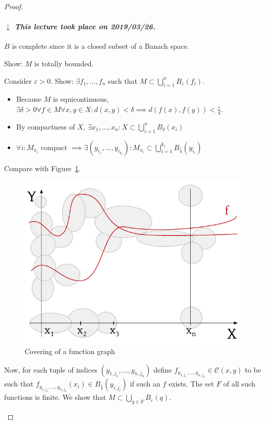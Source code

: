\documentclass{article}
\numberwithin{lecref}{section}
\newcommand{\dateref}[1]{%
  \begin{mdframed}[backgroundcolor=gray!10,innerbottommargin=0pt,innertopmargin=0pt]
    \paragraph{\textit{$\downarrow$ This lecture took place on #1.}}%
  \end{mdframed}%
}
\begin{document}
\begin{proof}
\begin{enumerate}
\begin{description}
					\dateref{2019/03/26}
					$B$ is complete since it is a closed subset of a Banach space.

					Show: $M$ is totally bounded.

					Consider $\varepsilon > 0$. Show: $\exists f_1, \dots, f_n$ such that $M \subset \bigcup_{i=1}^n B_\varepsilon(f_i)$.

					\begin{itemize}
						\item Because $M$ is equicontinuous, $\exists \delta > 0 \forall f \in M \forall x, y \in X: d(x, y) < \delta \implies d(f(x), f(y)) < \frac\varepsilon4$.
						\item By compactness of $X$, $\exists x_1, \dots, x_n: X \subset \bigcup_{i=1}^n B_\delta(x_i)$
						\item $\forall i: M_{x_i} \text{ compact } \implies \exists (y_{i_1}, \dots, y_{i_{k_i}}): M_{x_i} \subset \bigcup_{i=1}^{k_i} B_{\frac\varepsilon4}(y_{i_i})$
					\end{itemize}

					Compare with Figure~\ref{img:cov}.

					\begin{figure}[t]
						\begin{center}
							\includegraphics{img/covering.pdf}
							\caption{Covering of a function graph}
							\label{img:cov}
						\end{center}
					\end{figure}

					Now, for each tuple of indices $(y_{1,j_1}, \dots, y_{n,j_n})$ define $f_{y_{1,j_1}, \dots, y_{n,j_n}} \in \mathcal C(x, y)$ to be such that $f_{y_{1,j_1},\dots,y_{n,j_n}}(x_i) \in B_{\frac\varepsilon4}(y_{i,j_i})$ if such an $f$ exists. The set $F$ of all such functions is finite. We show that $M \subset \bigcup_{q \in F} B_{\varepsilon}(q)$.


\end{description}
\end{enumerate}
\end{proof}
\end{document}
